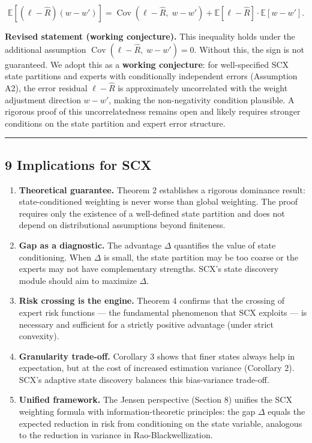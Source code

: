\documentclass[
  12pt,
]{article}
\begin{document}
\[\mathbb{E}[(\ell - \hat{R})(w - w')] = \operatorname{Cov}(\ell - \hat{R},\; w - w') + \mathbb{E}[\ell - \hat{R}] \cdot \mathbb{E}[w - w'].\]

\textbf{Revised statement (working conjecture).} This inequality holds
under the additional assumption
\(\operatorname{Cov}(\ell - \hat{R},\; w - w') = 0\). Without this, the
sign is not guaranteed. We adopt this as a \textbf{working conjecture}:
for well-specified SCX state partitions and experts with conditionally
independent errors (Assumption A2), the error residual
\(\ell - \hat{R}\) is approximately uncorrelated with the weight
adjustment direction \(w - w'\), making the non-negativity condition
plausible. A rigorous proof of this uncorrelatedness remains open and
likely requires stronger conditions on the state partition and expert
error structure.

\begin{center}\rule{0.5\linewidth}{0.5pt}\end{center}

\subsection{9 Implications for SCX}\label{implications-for-scx}

\begin{enumerate}
\def\labelenumi{\arabic{enumi}.}
\item
  \textbf{Theoretical guarantee.} Theorem 2 establishes a rigorous
  dominance result: state-conditioned weighting is never worse than
  global weighting. The proof requires only the existence of a
  well-defined state partition and does not depend on distributional
  assumptions beyond finiteness.
\item
  \textbf{Gap as a diagnostic.} The advantage \(\Delta\) quantifies the
  value of state conditioning. When \(\Delta\) is small, the state
  partition may be too coarse or the experts may not have complementary
  strengths. SCX's state discovery module should aim to maximize
  \(\Delta\).
\item
  \textbf{Risk crossing is the engine.} Theorem 4 confirms that the
  crossing of expert risk functions --- the fundamental phenomenon that
  SCX exploits --- is necessary and sufficient for a strictly positive
  advantage (under strict convexity).
\item
  \textbf{Granularity trade-off.} Corollary 3 shows that finer states
  always help in expectation, but at the cost of increased estimation
  variance (Corollary 2). SCX's adaptive state discovery balances this
  bias-variance trade-off.
\item
  \textbf{Unified framework.} The Jensen perspective (Section 8) unifies
  the SCX weighting formula with information-theoretic principles: the
  gap \(\Delta\) equals the expected reduction in risk from conditioning
  on the state variable, analogous to the reduction in variance in
  Rao-Blackwellization.
\end{enumerate}
\end{document}
